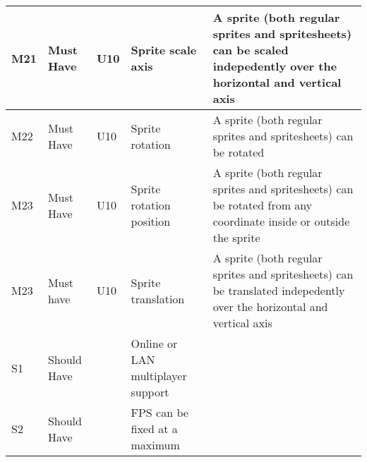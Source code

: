 \documentclass{article} %
\begin{document}
\begin{longtable}{|p{}|p{}|p{}|p{}|p{}|}
    M21 & Must Have & U10 & Sprite scale axis & A sprite (both regular sprites and spritesheets) can be scaled indepedently over the horizontal and vertical axis \\ \hline
    M22 & Must Have & U10 & Sprite rotation & A sprite (both regular sprites and spritesheets) can be rotated \\ \hline
    M23 & Must Have & U10 & Sprite rotation position & A sprite (both regular sprites and spritesheets) can be rotated from any coordinate inside or outside the sprite \\ \hline
    M23 & Must have & U10 & Sprite translation & A sprite (both regular sprites and spritesheets) can be translated indepedently over the horizontal and vertical axis \\ \hline
    S1                          & Should Have                        &                & Online or LAN multiplayer support &                                                                                                                                                             \\ \hline
    S2                          & Should Have                        &                    & FPS can be fixed at a maximum     &                                                                                                                                                             \\ \hline
\end{longtable}
\newpage
\end{document}
